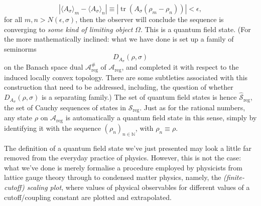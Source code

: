 \documentclass[11pt]{amsart}
\DeclareMathOperator{\tr}{tr}
\theoremstyle{plain}%
\theoremstyle{definition}
\theoremstyle{remark}
\begin{document}
\begin{equation}\label{eq:qftCauchycondn}
	|\langle A_\sigma\rangle_m - \langle A_\sigma \rangle_n| \equiv |\tr(A_\sigma (\rho_m - \rho_n))| < \epsilon,
\end{equation}
for all $m,n>N(\epsilon,\sigma)$, then the observer will conclude the sequence is converging to \emph{some kind of limiting object} $\Omega$. This is a quantum field state. (For the more mathematically inclined: what we have done is set up a family of seminorms 
\begin{equation}
	D_{A_\sigma}(\rho, \sigma)
\end{equation}
on the Banach space dual $\mathcal{A}_{\text{reg}}^{\#}$ of $\mathcal{A}_{\text{reg}}$, and completed it with respect to the induced locally convex topology. There are some subtleties associated with this construction that need to be addressed, including, the question of whether $D_{A_\sigma}(\rho, \sigma)$ is a separating family.) The set of quantum field states is hence $\widehat{\mathcal{S}}_{\text{reg}}$, the set of Cauchy sequences of states in $\mathcal{S}_{\text{reg}}$. Just as for the rational numbers, any state $\rho$ on $\mathcal{A}_{\text{reg}}$ is automatically a quantum field state in this sense, simply by identifying it with the sequence $(\rho_n)_{n\in\mathbb{N}}$, with $\rho_n \equiv \rho$.

The definition of a quantum field state we've just presented may look a little far removed from the everyday practice of physics. However, this is not the case: what we've done is merely formalise a procedure employed by physicists from lattice gauge theory through to condensed matter physics, namely, the \emph{(finite-cutoff) scaling plot}, where values of physical observables for different values of a cutoff/coupling constant are plotted and extrapolated. 
\end{document}
